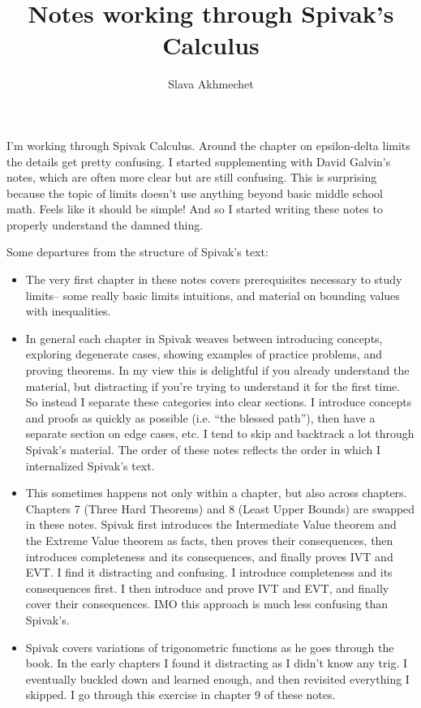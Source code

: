 \documentclass{article}
\title{Notes working through Spivak's Calculus}
\author{Slava Akhmechet}
\begin{document}
\maketitle

I'm working through Spivak Calculus. Around the chapter on
epsilon-delta limits the details get pretty confusing. I started
supplementing with David Galvin's notes, which are often more clear
but are still confusing. This is surprising because the topic of
limits doesn't use anything beyond basic middle school math. Feels
like it should be simple! And so I started writing these notes to
properly understand the damned thing.

\vs

Some departures from the structure of Spivak's text:
\begin{itemize}
\item The very first chapter in these notes covers prerequisites
  necessary to study limits-- some really basic limits intuitions, and
  material on bounding values with inequalities.
\item In general each chapter in Spivak weaves between introducing
  concepts, exploring degenerate cases, showing examples of practice
  problems, and proving theorems. In my view this is delightful if you
  already understand the material, but distracting if you're trying to
  understand it for the first time. So instead I separate these
  categories into clear sections. I introduce concepts and proofs as
  quickly as possible (i.e. ``the blessed path''), then have a
  separate section on edge cases, etc. I tend to skip and backtrack a
  lot through Spivak's material. The order of these notes reflects the
  order in which I internalized Spivak's text.
\item This sometimes happens not only within a chapter, but also
  across chapters. Chapters 7 (Three Hard Theorems) and 8 (Least Upper
  Bounds) are swapped in these notes. Spivak first introduces the
  Intermediate Value theorem and the Extreme Value theorem as facts,
  then proves their consequences, then introduces completeness and its
  consequences, and finally proves IVT and EVT. I find it distracting
  and confusing. I introduce completeness and its consequences first.
  I then introduce and prove IVT and EVT, and finally cover their
  consequences. IMO this approach is much less confusing than
  Spivak's.
\item Spivak covers variations of trigonometric functions as he goes
  through the book. In the early chapters I found it distracting as I
  didn't know any trig. I eventually buckled down and learned enough,
  and then revisited everything I skipped. I go through this exercise
  in chapter 9 of these notes.
\end{itemize}

\clearpage
\tableofcontents

\clearpage

\clearpage

\clearpage

\clearpage

\clearpage

\clearpage

\clearpage

\clearpage

\clearpage

\clearpage

\end{document}
